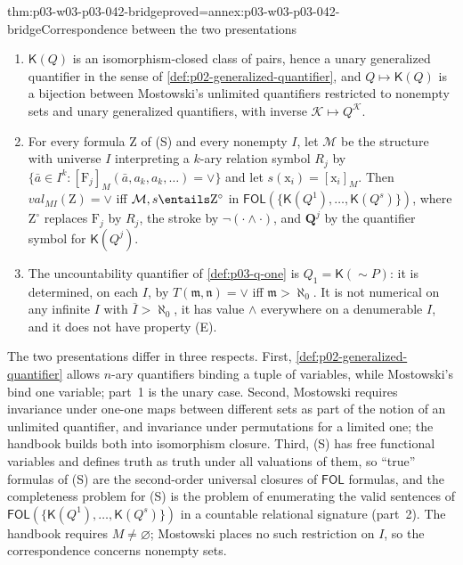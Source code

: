 \begin{hbtheorem}{thm:p03-w03-p03-042-bridge}{proved=annex:p03-w03-p03-042-bridge}{Correspondence between the two presentations}
\begin{enumerate}
\item \(\mathsf K(Q)\) is an isomorphism-closed class of pairs, hence a
      unary generalized quantifier in the sense of
      \cref{def:p02-generalized-quantifier}, and \(Q\mapsto\mathsf K(Q)\)
      is a bijection between Mostowski's unlimited quantifiers restricted
      to nonempty sets and unary generalized quantifiers, with inverse
      \(\mathcal K\mapsto Q^{\mathcal K}\).
\item For every formula \(\mathrm Z\) of (S) and every nonempty \(I\), let
      \(\mathcal M\) be the structure with universe \(I\) interpreting a
      \(k\)-ary relation symbol \(R_j\) by
      \(\{\bar a\in I^k:[\mathrm F_j]_M(\bar a,a_k,a_k,\ldots)=\vee\}\) and
      let \(s(\mathrm x_i)=[\mathrm x_i]_M\).  Then
      \(\mathit{val}_{MI}(\mathrm Z)=\vee\) iff
      \(\mathcal M,s\entails\mathrm Z^\circ\) in
      \(\mathsf{FOL}(\{\mathsf K(Q^1),\ldots,\mathsf K(Q^s)\})\), where
      \(\mathrm Z^\circ\) replaces \(\mathrm F_j\) by \(R_j\), the stroke
      by \(\neg(\cdot\land\cdot)\), and \(\mathbf Q^j\) by the quantifier
      symbol for \(\mathsf K(Q^j)\).
\item The uncountability quantifier of \cref{def:p03-q-one} is
      \(Q_1=\mathsf K({\sim}P)\): it is determined, on each \(I\), by
      \(T(\mathfrak m,\mathfrak n)=\vee\) iff \(\mathfrak m>\aleph_0\).
      It is not numerical on any infinite \(I\) with
      \(\overline I>\aleph_0\), it has value \(\wedge\) everywhere on a
      denumerable \(I\), and it does not have property (E).
\end{enumerate}
\end{hbtheorem}

The two presentations differ in three respects.  First,
\cref{def:p02-generalized-quantifier} allows \(n\)-ary quantifiers binding
a tuple of variables, while Mostowski's bind one variable; part~1 is the
unary case.  Second, Mostowski requires invariance under one-one maps
between different sets as part of the notion of an unlimited quantifier,
and invariance under permutations for a limited one; the handbook builds
both into isomorphism closure.  Third, (S) has free functional variables
and defines truth as truth under all valuations of them, so ``true''
formulas of (S) are the second-order universal closures of
\(\mathsf{FOL}\) formulas, and the completeness problem for (S) is the
problem of enumerating the valid sentences of
\(\mathsf{FOL}(\{\mathsf K(Q^1),\ldots,\mathsf K(Q^s)\})\) in a countable
relational signature (part~2).  The handbook requires \(M\neq\varnothing\); Mostowski
places no such restriction on \(I\), so the correspondence concerns
nonempty sets.

